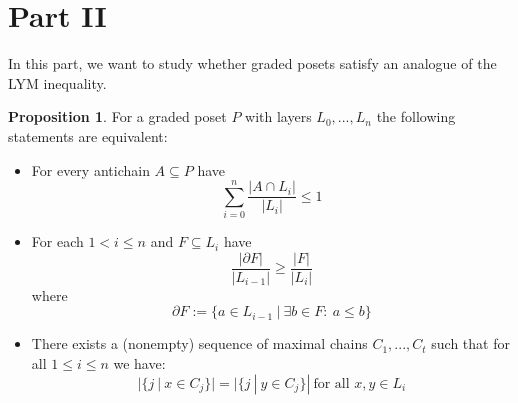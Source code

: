 \documentclass{scrartcl}
\theoremstyle{definition}
\newtheorem{proposition}[definition]{Proposition}
\begin{document}
\section{Part II}
In this part, we want to study whether graded posets satisfy an analogue of the LYM inequality.
\begin{proposition}
    \label{prop:characterization_lym}
    For a graded poset $P$ with layers $L_0, ..., L_n$ the following statements are equivalent:
    \begin{itemize}
        \item For every antichain $A \subseteq P$ have
        \begin{equation*}
            \sum_{i = 0}^n \frac {|A \cap L_i|} {|L_i|} \leq 1
        \end{equation*}
        \item For each $1 < i \leq n$ and $F \subseteq L_i$ have
        \begin{equation*}
            \frac {|\partial F|} {|L_{i - 1}|} \geq \frac {|F|} {|L_i|}
        \end{equation*}
        where
        \begin{equation*}
            \partial F := \{ a \in L_{i - 1} \ | \ \exists b \in F: \ a \leq b \}
        \end{equation*}
        \item There exists a (nonempty) sequence of maximal chains $C_1, ..., C_t$ such that for all $1 \leq i \leq n$ we have:
        \begin{equation*}
            |\{ j \ | \ x \in C_j \}| = |\{ j \ | \ y \in C_j \}| \ \text{for all $x, y \in L_i$}
        \end{equation*}
    \end{itemize}
\end{proposition}
\end{document}
